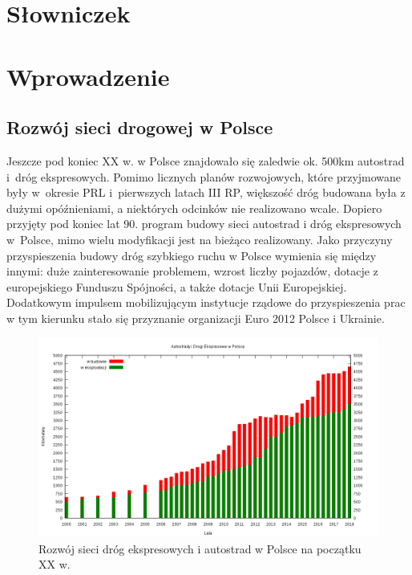 \tableofcontents


\chapter{Słowniczek}
\printglossaries

\chapter{Wprowadzenie}
\section{Rozwój sieci drogowej w Polsce}

Jeszcze pod koniec XX w. w Polsce znajdowało się zaledwie ok. 500km autostrad i~dróg ekspresowych. Pomimo licznych planów rozwojowych, które przyjmowane były w~okresie PRL i~pierwszych latach III RP, większość dróg budowana była z dużymi opóźnieniami, a niektórych odcinków nie realizowano wcale.\newline
Dopiero przyjęty pod koniec lat 90. program budowy sieci autostrad i dróg ekspresowych w~Polsce, mimo wielu modyfikacji jest na bieżąco realizowany. Jako przyczyny\cite{siec-drogowa-IIIrp} przyspieszenia budowy dróg szybkiego ruchu w Polsce wymienia się między innymi: duże zainteresowanie problemem, wzrost liczby pojazdów, dotacje z europejskiego Funduszu Spójności, a także dotacje Unii Europejskiej. Dodatkowym impulsem mobilizującym instytucje rządowe do przyspieszenia prac w tym kierunku stało się przyznanie organizacji Euro 2012 Polsce i Ukrainie.\newline
\begin{figure}[h]
\caption{Rozwój sieci dróg ekspresowych i autostrad w Polsce na początku XX w.}
\includegraphics[width=\textwidth]{images/1024px-PL-Motorways.png}
\end{figure} \newline
